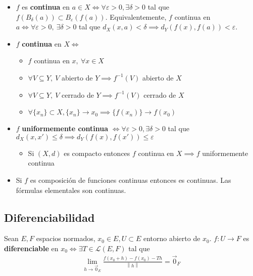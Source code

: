 \documentclass[a4paper,twocolumn]{extarticle}
\newcommand{\norma}[1]{\left\lVert#1\right\rVert}
\newcommand{\lacot}[1]{\mathcal{L}(#1)}
\begin{document}
\begin{itemize}
	\item $f$ es \textbf{continua} en $a \in X \iff \forall \varepsilon > 0, \exists \delta > 0$ tal que $f(B_\delta(a)) \subset B_\varepsilon(f(a))$. Equivalentemente, $f$ continua en $a \iff \forall \varepsilon > 0,\ \exists \delta > 0$ tal que $d_X(x, a) < \delta \implies d_Y(f(x), f(a)) < \varepsilon$.
	\item $f$ \textbf{continua} en $X \iff$
	\begin{itemize}
		\item $f$ continua en $x,\ \forall x \in X$
		\item $\forall V \subseteq Y,\ V$ abierto de $Y \implies f^{-1}(V)$ abierto de $X$
		\item $\forall V \subseteq Y,\ V$ cerrado de $Y \implies f^{-1}(V)$ cerrado de $X$
		\item $\forall \{x_n\} \subset X, \{x_n\} \to x_0 \implies \{f(x_n)\} \to f(x_0)$
	\end{itemize}
	
	\item $f$ \textbf{uniformemente continua} $\iff \forall \varepsilon > 0, \exists \delta > 0$ tal que $d_X(x, x') \leq \delta \implies d_Y(f(x), f(x')) \leq \varepsilon$
	\begin{itemize}
		\item Si $(X,d)$ es compacto entonces $f$ continua en $X \implies f$ uniformemente continua
	\end{itemize}
	\item Si $f$ es composición de funciones continuas entonces es continuas. Las fórmulas elementales son continuas.
\end{itemize}

\subsection{Diferenciabilidad}
Sean $E, F$ espacios normados, $x_0 \in E, U \subset E$ entorno abierto de $x_0$. $f:U \to F$ es \textbf{diferenciable} en $x_0 \iff \exists T \in \lacot{E, F}$ tal que
\begin{align*}
	\lim_{h \to \vec{0}_E} \frac{f(x_0 + h) - f(x_0) - Th}{\norma{h}} = \vec{0}_F
\end{align*}
\end{document}
